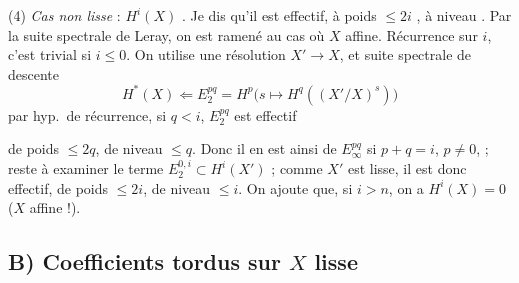 \documentclass[11pt,a4paper]{article}
\begin{document}
(4) \emph{Cas non lisse} : $H^{i}(X)$ . Je dis qu'il est
effectif, à poids $\leqslant 2i$ , à
niveau  \ill{}.
Par la suite spectrale de Leray, on est ramené au cas où $X$ affine. Récurrence
sur $i$, c'est trivial si $i \leqslant 0$. On utilise une résolution
$X' \to X$, et suite spectrale de descente
\[
H^{*}(X) \Longleftarrow E_{2}^{pq} = H^{p}\bigl(s \mapsto
H^{q}((X'/X)^{s})\bigr)
\]
par hyp.\ de récurrence, si $q < i$, $E_{2}^{pq}$ est effectif

de  poids $\leqslant 2q$, de niveau $\leqslant q$. Donc il en
est ainsi de $E_{\infty}^{pq}$ si $p+q = i$, $p \neq 0$,  ; reste à examiner le terme
$E_{2}^{0,i} \subset H^{i}(X')$ ; comme $X'$ est lisse, il est donc effectif,
de poids $\leqslant 2i$, de niveau $\leqslant i$. On ajoute que, si $i > n$,
on a $H^{i}(X) = 0$ ($X$ affine !).


\subsection{B) Coefficients tordus sur $X$ lisse}
\end{document}
